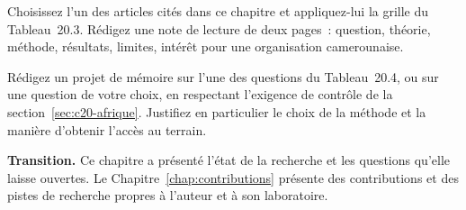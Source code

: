 \begin{boxexo}[title={\ding{45}\quad Exercice~20.2. Lire un article \niveaumoyen}]
Choisissez l'un des articles cités dans ce chapitre et appliquez-lui la
grille du Tableau~20.3. Rédigez une note de lecture de deux pages~:
question, théorie, méthode, résultats, limites, intérêt pour une
organisation camerounaise.
\end{boxexo}

\begin{boxexo}[title={\ding{45}\quad Exercice~20.3. Un projet de mémoire \niveauexpert}]
Rédigez un projet de mémoire sur l'une des questions du Tableau~20.4, ou
sur une question de votre choix, en respectant l'exigence de contrôle de
la section~\ref{sec:c20-afrique}. Justifiez en particulier le choix de la
méthode et la manière d'obtenir l'accès au terrain.
\end{boxexo}

\bigskip

\begin{boxinfo}
\textbf{Transition.} Ce chapitre a présenté l'état de la recherche et les
questions qu'elle laisse ouvertes. Le Chapitre~\ref{chap:contributions}
présente des contributions et des pistes de recherche propres à
l'auteur et à son laboratoire.
\end{boxinfo}
